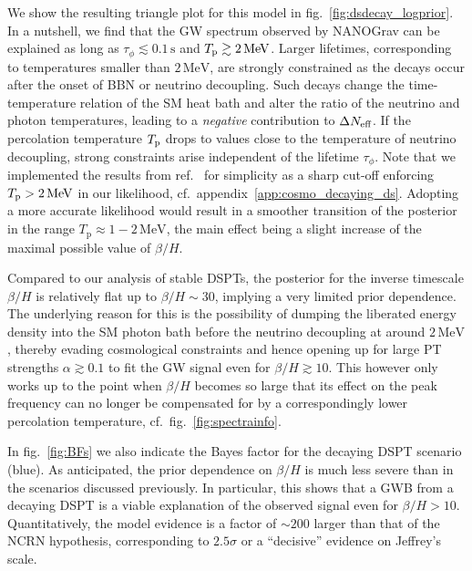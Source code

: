 We show the resulting triangle plot for this model in fig.~\ref{fig:dsdecay_logprior}. In a nutshell, we find that the \ac{GW} spectrum observed by \ac{NANOGrav} can be   explained as long as $\tau_\phi \lesssim 0.1 \, \text{s}$ and $T_{\text{p}} \gtrsim 2 \, \text{MeV}$. Larger lifetimes, corresponding to temperatures smaller than $2\,\text{MeV}$, are strongly constrained as the decays occur after the onset of \ac{BBN} or neutrino decoupling. Such decays change the time-temperature relation of the \ac{SM} heat bath and alter the ratio of the neutrino and photon temperatures, leading to a \textit{negative} contribution to $\Delta N_\text{eff} $. If the percolation temperature $T_{\text{p}}$ drops to values close to the temperature of neutrino decoupling, strong constraints arise independent of the lifetime $\tau_\phi$. Note that we implemented the results from ref.~\cite{Bai:2021ibt} for simplicity as a sharp cut-off enforcing $T_{\text{p}}>2 \, \text{MeV}$ in our likelihood, cf.~appendix~\ref{app:cosmo_decaying_ds}. Adopting a more accurate likelihood would result in a smoother transition of the posterior in the range $T_\mathrm{p} \approx 1 - 2 \, \text{MeV}$, the main effect being a slight increase of the maximal possible value of $\beta / H$.

Compared to our analysis of stable \acp{DSPT}, the posterior for the inverse timescale $\beta/H$ is relatively flat up to $\beta/H\sim30$, implying a very limited prior dependence. The underlying reason for this is  the possibility of dumping the liberated energy density into the \ac{SM} photon bath before the neutrino decoupling at  around $2 \, \text{MeV}$, thereby evading  cosmological constraints and hence opening up for large \ac{PT} strengths $\alpha \gtrsim0.1$ to fit the \ac{GW} signal even for $\beta/H \gtrsim 10$. This however only works up to the point when $\beta/H$ becomes so large that its effect on the peak frequency can no longer be compensated for by a correspondingly lower percolation temperature, cf.~fig.~\ref{fig:spectrainfo}.

In fig.~\ref{fig:BFs} we also indicate the Bayes factor for the decaying \ac{DSPT} scenario (blue). As anticipated, the prior dependence on $\beta/H$ is much less  severe than in the scenarios discussed previously. In particular, this shows that a \ac{GWB} from a decaying \ac{DSPT} is a viable explanation of the observed signal even for $\beta/H > 10$. Quantitatively, the model evidence is a factor of $\sim200$ larger than that of the \ac{NCRN} hypothesis, corresponding to $2.5 \sigma$ or a ``decisive'' evidence on Jeffrey's scale.



